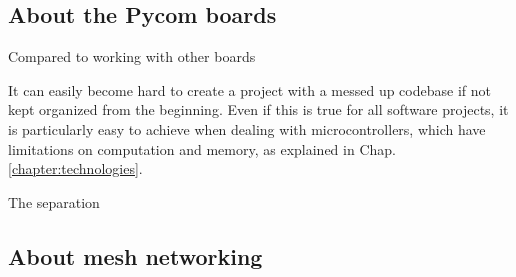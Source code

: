 		\subsection{About the Pycom boards}
		
			Compared to working with other boards
			
			It can easily become hard to create a project with a messed up codebase if not kept organized from the beginning.
			Even if this is true for all software projects, it is particularly easy to achieve when dealing with microcontrollers, which have limitations on computation and memory, as explained in Chap. \ref{chapter:technologies}.
			
			The separation 
			
			
		\subsection{About mesh networking}

